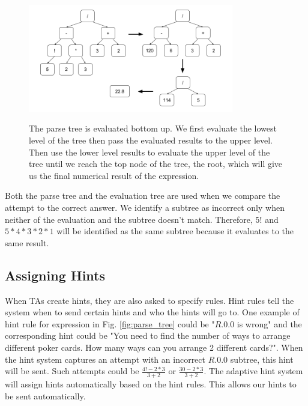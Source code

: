 \documentclass{llncs2e/llncs}
\begin{document}
\begin{figure}[ht]
   \centering
   \caption{The parse tree is evaluated bottom up. We first evaluate the lowest level of the tree then pass the evaluated results to the upper level. Then use the lower level results to evaluate the upper level of the tree until we reach the top node of the tree, the root, which will give us the final numerical result of the expression.}
   \includegraphics[width=0.8\textwidth]{image/Eval_Trees.png}
   \label{fig:eval_tree}
\end{figure}

Both the parse tree and the evaluation tree are used when we compare the attempt to the correct answer. We identify a subtree as incorrect only when neither of the evaluation and the subtree doesn't match. Therefore, $5!$ and $5*4*3*2*1$ will be identified as the same subtree because it evaluates to the same result.


\subsection*{Assigning Hints}
When TAs create hints, they are also asked to specify rules. Hint rules tell the system when to send certain hints and who the hints will go to. One example of hint rule for expression in Fig. \ref{fig:parse_tree} could be "$R.0.0$ is wrong" and the corresponding hint could be "You need to find the number of ways to arrange different poker cards. How many ways can you arrange 2 different cards?". When the hint system captures an attempt with an incorrect $R.0.0$ subtree, this hint will be sent. Such attempts could be $\frac{4!-2*3}{3+2}$ or $\frac{30-2*3}{3+2}$. The adaptive hint system will assign hints automatically based on the hint rules. This allows our hints to be sent automatically.
\end{document}
